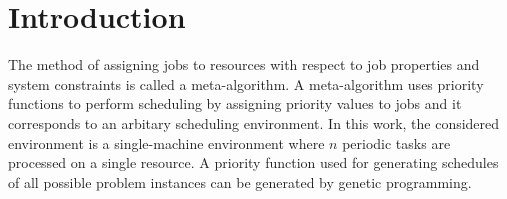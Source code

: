 \chapter{Introduction}
The method of assigning jobs to resources with respect to job properties and system constraints is called a meta-algorithm.
A meta-algorithm uses priority functions to perform scheduling by assigning priority values to jobs and it corresponds to an arbitary scheduling environment. 
In this work, the considered environment is a single-machine environment where $n$ periodic tasks are processed on a single resource. 
A priority function used for generating schedules of all possible problem instances can be generated by genetic programming.